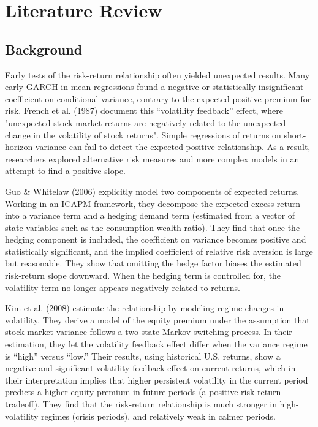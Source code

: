 \documentclass[12pt]{article}
\begin{document}
\section{Literature Review}
\subsection{Background}
Early tests of the risk-return relationship often yielded unexpected results. Many early GARCH-in-mean regressions found a negative or statistically insignificant coefficient on conditional variance, contrary to the expected positive premium for risk. French et al. (1987) document this “volatility feedback” effect, where "unexpected stock market returns are negatively related to the unexpected change in the volatility of stock returns". Simple regressions of returns on short-horizon variance can fail to detect the expected positive relationship. As a result, researchers explored alternative risk measures and more complex models in an attempt to find a positive slope.\par
Guo \& Whitelaw (2006) explicitly model two components of expected returns. Working in an ICAPM framework, they decompose the expected excess return into a variance term and a hedging demand term (estimated from a vector of state variables such as the consumption-wealth ratio). They find that once the hedging component is included, the coefficient on variance becomes positive and statistically significant, and the implied coefficient of relative risk aversion is large but reasonable. They show that omitting the hedge factor biases the estimated risk‐return slope downward. When the hedging term is controlled for, the volatility term no longer appears negatively related to returns.\par
Kim et al. (2008) estimate the relationship by modeling regime changes in volatility. They derive a model of the equity premium under the assumption that stock market variance follows a two-state Markov-switching process. In their estimation, they let the volatility feedback effect differ when the variance regime is “high” versus “low.” Their results, using historical U.S. returns, show a negative and significant volatility feedback effect on current returns, which in their interpretation implies that higher persistent volatility in the current period predicts a higher equity premium in future periods (a positive risk-return tradeoff). They find that the risk-return relationship is much stronger in high-volatility regimes (crisis periods), and relatively weak in calmer periods.\par
\end{document}
